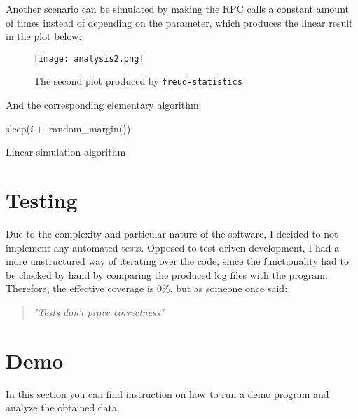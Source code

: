     \vspace{5mm}

    Another scenario can be simulated by making the RPC calls a constant amount of times instead
    of depending on the parameter, which produces the linear result in the plot below:\\

    \begin{figure}[H]
        \centering
        \texttt{[image: analysis2.png]}
        \caption{The second plot produced by \texttt{freud-statistics}}
        \label{fig:analysis2}
    \end{figure}

    And the corresponding elementary algorithm:\\

    \begin{algorithm}[H]
        \SetAlgoLined
         {
             {
                sleep($i + $ random\_margin())\;
            }
        }
        \caption{Linear simulation algorithm}
    \end{algorithm}

    \vspace{5mm}


    \section{Testing}

        Due to the complexity and particular nature of the software, I decided to not implement any automated
        tests. Opposed to test-driven development, I had a more unstructured way of iterating over the code,
        since the functionality had to be checked by hand by comparing the produced log files with the program.
        Therefore, the effective coverage is 0\%, but as someone once said:\\

        \begin{quote} 
            \centering 
            \textit{"Tests don't prove correctness"}
        \end{quote}


    \section{Demo}

        In this section you can find instruction on how to run a demo program and analyze the obtained data.\\

